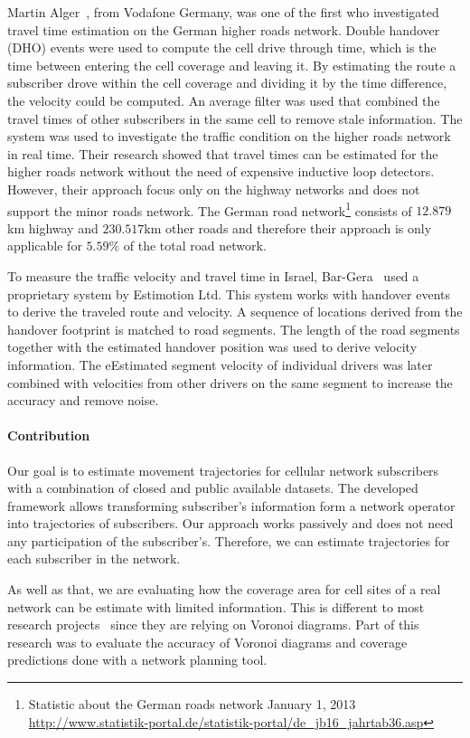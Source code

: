 \documentclass[twocolumn]{bmcart}%
\begin{document}
Martin Alger~\cite{Alger2004}, from Vodafone Germany, was one of the first who investigated travel time estimation on the German higher roads network. Double handover (DHO) events were used to compute the cell drive through time, which is the time between entering the cell coverage and leaving it. By estimating the route a subscriber drove within the cell coverage and dividing it by the time difference, the velocity could be computed. An average filter was used that combined the travel times of other subscribers in the same cell to remove stale information. The system was used to investigate the traffic condition on the higher roads network in real time. Their research showed that travel times can be estimated for the higher roads network without the need of expensive inductive loop detectors. However, their approach focus only on the highway networks and does not support the minor roads network. The German road network\footnote{Statistic about the German roads network January 1, 2013 \url{http://www.statistik-portal.de/statistik-portal/de_jb16_jahrtab36.asp}} consists of $12.879$km highway and $230.517$km other roads and therefore their approach is only applicable for $5.59\%$ of the total road network.\newline

To measure the traffic velocity and travel time in Israel, Bar-Gera~\cite{Bar2007} used a proprietary system by Estimotion Ltd. This system works with handover events to derive the traveled route and velocity. A sequence of locations derived from the handover footprint is matched to road segments. The length of the road segments together with the estimated handover position was used to derive velocity information. The eEstimated segment velocity of individual drivers was later combined with velocities from other drivers on the same segment to increase the accuracy and remove noise.

\paragraph*{Contribution}
Our goal is to estimate movement trajectories for cellular network subscribers with a combination of closed and public available datasets. The developed framework allows transforming subscriber's information form a network operator into trajectories of subscribers. Our approach works passively and does not need any participation of the subscriber's. Therefore, we can estimate trajectories for each subscriber in the network.

As well as that, we are evaluating how the coverage area for cell sites of a real network can be estimate with limited information. This is different to most research projects~\cite{Gonzalez2008,Tettamanti2012} since they are relying on Voronoi diagrams. Part of this research was to evaluate the accuracy of Voronoi diagrams and coverage predictions done with a network planning tool.
\end{document}
